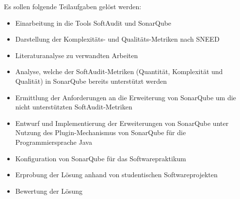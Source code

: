 \documentclass[gb,ngerman]{stthesis}
\begin{document}
		Es sollen folgende Teilaufgaben gelöst werden: 
		\begin{itemize}
		\item Einarbeitung in die Tools SoftAudit und SonarQube
		\item Darstellung der Komplexitäts- und Qualitäts-Metriken nach SNEED
		\item Literaturanalyse zu verwandten Arbeiten
		\item Analyse, welche der SoftAudit-Metriken (Quantität, Komplexität und Qualität) in SonarQube bereits unterstützt werden
		\item Ermittlung der Anforderungen an die Erweiterung von SonarQube um die nicht unterstützten SoftAudit-Metriken
		\item Entwurf und Implementierung der Erweiterungen von SonarQube unter Nutzung des Plugin-Mechanismus von SonarQube für die Programmiersprache Java
		\item Konfiguration von SonarQube für das Softwarepraktikum
		\item Erprobung der Lösung anhand von studentischen Softwareprojekten
		\item Bewertung der Lösung
		\end{itemize}
		
	\tableofcontents
  
\end{document}

